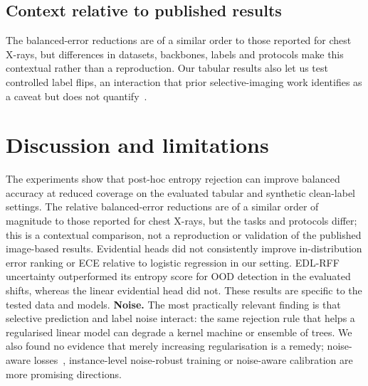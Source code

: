 \documentclass[conference]{IEEEtran}
\begin{document}
\begin{table}[t]
\centering\caption{Three-class results (mean $\pm$ s.d. over 10 seeds). BA is macro recall.}\label{tab:multi}
\scriptsize\resizebox{\textwidth}{!}{}
\end{table}

\subsection{Context relative to published results}
The balanced-error reductions are of a similar order to those reported for chest X-rays, but differences in datasets, backbones, labels and protocols make this contextual rather than a reproduction. Our tabular results also let us test controlled label flips, an interaction that prior selective-imaging work identifies as a caveat but does not quantify~\cite{aperstein2026selective}.


\section{Discussion and limitations}
The experiments show that post-hoc entropy rejection can improve balanced accuracy at reduced coverage on the evaluated tabular and synthetic clean-label settings. The relative balanced-error reductions are of a similar order of magnitude to those reported for chest X-rays, but the tasks and protocols differ; this is a contextual comparison, not a reproduction or validation of the published image-based results. Evidential heads did not consistently improve in-distribution error ranking or ECE relative to logistic regression in our setting. EDL-RFF uncertainty outperformed its entropy score for OOD detection in the evaluated shifts, whereas the linear evidential head did not. These results are specific to the tested data and models.
\textbf{Noise.} The most practically relevant finding is that selective prediction and label noise interact: the same rejection rule that helps a regularised linear model can degrade a kernel machine or ensemble of trees. We also found no evidence that merely increasing regularisation is a remedy; noise-aware losses~\cite{natarajan2013noisy}, instance-level noise-robust training or noise-aware calibration are more promising directions.
\end{document}
